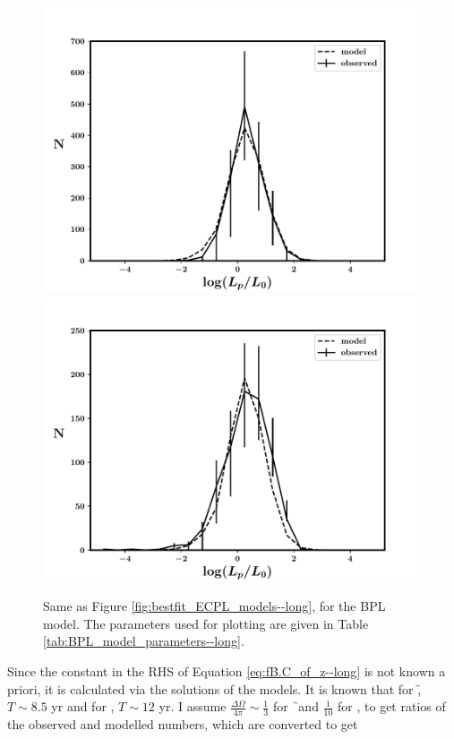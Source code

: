 \begin{figure}
\begin{center}
\end{center}
\begin{center}
\includegraphics[scale=0.38]{BPL--Fermi--total}
\includegraphics[scale=0.38]{BPL--Swift--total}
\caption[Comparison of data and fits for the BPL model]{Same as Figure \ref{fig:bestfit_ECPL_models--long}, for the BPL model. The parameters used for plotting are given in Table \ref{tab:BPL_model_parameters--long}.}
\label{fig:bestfit_BPL_models--long}
\end{center}
\end{figure}


Since the constant in the RHS of Equation \ref{eq:fB.C_of_z--long} is not known a priori, it is calculated via the solutions of the models. It is known that for \f, $T \sim 8.5$ yr and for \s, $T \sim 12$ yr. I assume $\frac{\Delta \Omega}{4 \pi} \sim \frac{1}{3}$ for \f\ and $\frac{1}{10}$ for \s, to get ratios of the observed and modelled numbers, which are converted to get

